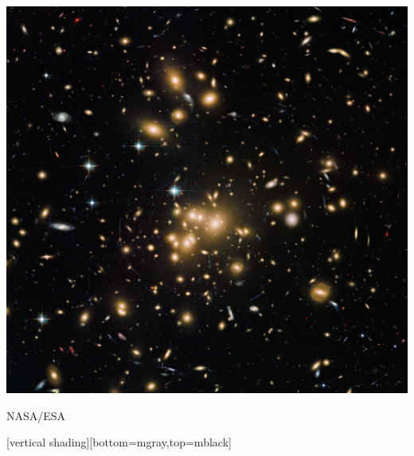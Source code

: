 \documentclass{beamer}
\begin{document}
{{\begin{itemize}
        \end{itemize}
        \begin{center}
            \includegraphics[trim=0 300 0 500,clip,width=\textwidth]{abell1689_hubble_1280.jpg}
        \end{center}
            \hfill {\tiny NASA/ESA}
    }
    [vertical shading][bottom=mgray,top=mblack]
}
\end{document}
